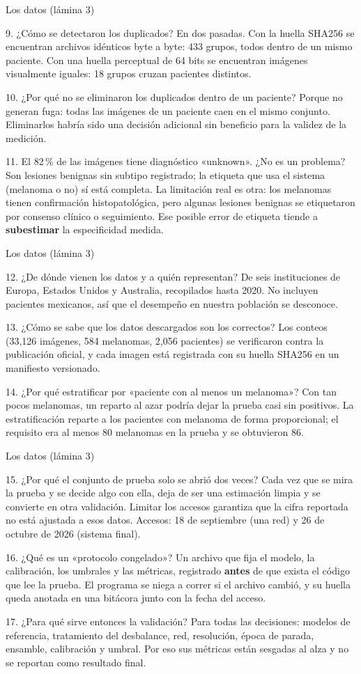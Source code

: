 \documentclass[aspectratio=169,10pt]{beamer}
\newcommand{\qa}[2]{\begin{block}{#1}\footnotesize #2\end{block}}
\begin{document}
\begin{frame}{Los datos (lámina 3)}
  \qa{9. ¿Cómo se detectaron los duplicados?}{
    En dos pasadas. Con la huella SHA256 se encuentran archivos idénticos byte a byte: 433 grupos, todos dentro de un mismo paciente. Con una huella perceptual de 64 bits se encuentran imágenes visualmente iguales: 18 grupos cruzan pacientes distintos.}
  \qa{10. ¿Por qué no se eliminaron los duplicados dentro de un paciente?}{
    Porque no generan fuga: todas las imágenes de un paciente caen en el mismo conjunto. Eliminarlos habría sido una decisión adicional sin beneficio para la validez de la medición.}
  \qa{11. El 82\,\% de las imágenes tiene diagnóstico «unknown». ¿No es un problema?}{
    Son lesiones benignas sin subtipo registrado; la etiqueta que usa el sistema (melanoma o no) sí está completa. La limitación real es otra: los melanomas tienen confirmación histopatológica, pero algunas lesiones benignas se etiquetaron por consenso clínico o seguimiento. Ese posible error de etiqueta tiende a \textbf{subestimar} la especificidad medida.}
\end{frame}

\begin{frame}{Los datos (lámina 3)}
  \qa{12. ¿De dónde vienen los datos y a quién representan?}{
    De seis instituciones de Europa, Estados Unidos y Australia, recopilados hasta 2020. No incluyen pacientes mexicanos, así que el desempeño en nuestra población se desconoce.}
  \qa{13. ¿Cómo se sabe que los datos descargados son los correctos?}{
    Los conteos (33,126 imágenes, 584 melanomas, 2,056 pacientes) se verificaron contra la publicación oficial, y cada imagen está registrada con su huella SHA256 en un manifiesto versionado.}
  \qa{14. ¿Por qué estratificar por «paciente con al menos un melanoma»?}{
    Con tan pocos melanomas, un reparto al azar podría dejar la prueba casi sin positivos. La estratificación reparte a los pacientes con melanoma de forma proporcional; el requisito era al menos 80 melanomas en la prueba y se obtuvieron 86.}
\end{frame}

\begin{frame}{Los datos (lámina 3)}
  \qa{15. ¿Por qué el conjunto de prueba solo se abrió dos veces?}{
    Cada vez que se mira la prueba y se decide algo con ella, deja de ser una estimación limpia y se convierte en otra validación. Limitar los accesos garantiza que la cifra reportada no está ajustada a esos datos. Accesos: 18 de septiembre (una red) y 26 de octubre de 2026 (sistema final).}
  \qa{16. ¿Qué es un «protocolo congelado»?}{
    Un archivo que fija el modelo, la calibración, los umbrales y las métricas, registrado \textbf{antes} de que exista el código que lee la prueba. El programa se niega a correr si el archivo cambió, y su huella queda anotada en una bitácora junto con la fecha del acceso.}
  \qa{17. ¿Para qué sirve entonces la validación?}{
    Para todas las decisiones: modelos de referencia, tratamiento del desbalance, red, resolución, época de parada, ensamble, calibración y umbral. Por eso sus métricas están sesgadas al alza y no se reportan como resultado final.}
\end{frame}
\end{document}
